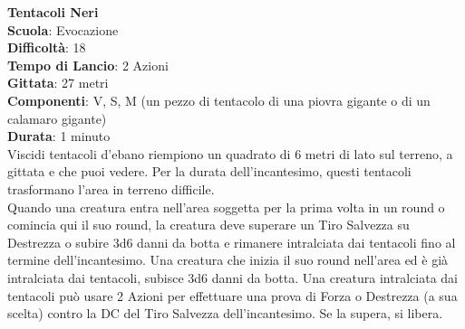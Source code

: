 \begin{multicols}{2}
\medskip\textbf{Tentacoli Neri}\\
\textbf{Scuola}: Evocazione\\
\textbf{Difficoltà}:  18\\
\textbf{Tempo di Lancio}: 2 Azioni\\
\textbf{Gittata}: 27 metri\\
\textbf{Componenti}: V, S, M (un pezzo di tentacolo di una piovra gigante o di un calamaro gigante)\\
\textbf{Durata}: 1 minuto\\
Viscidi tentacoli d’ebano riempiono un quadrato di 6 metri di lato sul terreno, a gittata e che puoi vedere. Per la durata dell'incantesimo, questi tentacoli trasformano l’area in terreno difficile.\\
Quando una creatura entra nell'area soggetta per la prima volta in un round o comincia qui il suo round, la creatura deve superare un Tiro Salvezza su Destrezza o subire 3d6 danni da botta e rimanere intralciata dai tentacoli fino al termine dell'incantesimo. Una creatura che inizia il suo round nell'area ed è già intralciata dai tentacoli, subisce 3d6 danni da botta. Una creatura intralciata dai tentacoli può usare 2 Azioni per effettuare una prova di Forza o Destrezza (a sua scelta) contro la DC del Tiro Salvezza dell'incantesimo. Se la supera, si libera.


\end{multicols}
